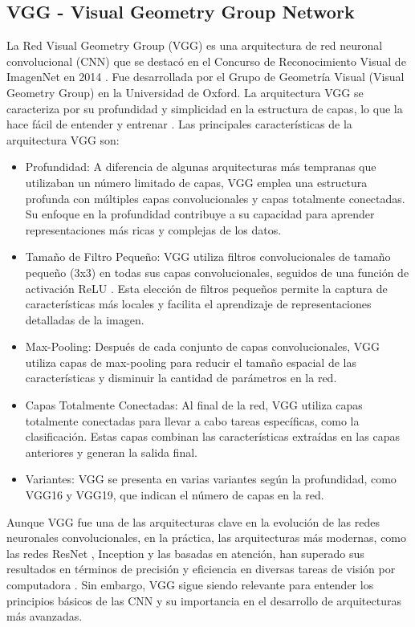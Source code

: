 \documentclass[12pt,twoside,titlepage]{ingenius}
\begin{document}
\begin{multicols}{2}
\subsection{VGG - Visual Geometry Group Network}
La Red Visual Geometry Group (VGG) es una arquitectura de red neuronal convolucional (CNN) que se destacó en el Concurso de Reconocimiento Visual de ImagenNet en 2014 \cite{11}. Fue desarrollada por el Grupo de Geometría Visual (Visual Geometry Group) en la Universidad de Oxford. La arquitectura VGG se caracteriza por su profundidad y simplicidad en la estructura de capas, lo que la hace fácil de entender y entrenar \cite{12}.
Las principales características de la arquitectura VGG son:
\begin{itemize}
	\item Profundidad: A diferencia de algunas arquitecturas más tempranas que utilizaban un número limitado de capas, VGG emplea una estructura profunda con múltiples capas convolucionales y capas totalmente conectadas. Su enfoque en la profundidad contribuye a su capacidad para aprender representaciones más ricas y complejas de los datos.
	\item Tamaño de Filtro Pequeño: VGG utiliza filtros convolucionales de tamaño pequeño (3x3) en todas sus capas convolucionales, seguidos de una función de activación ReLU . Esta elección de filtros pequeños permite la captura de características más locales y facilita el aprendizaje de representaciones detalladas de la imagen.
	\item Max-Pooling: Después de cada conjunto de capas convolucionales, VGG utiliza capas de max-pooling para reducir el tamaño espacial de las características y disminuir la cantidad de parámetros en la red.
	\item Capas Totalmente Conectadas: Al final de la red, VGG utiliza capas totalmente conectadas para llevar a cabo tareas específicas, como la clasificación. Estas capas combinan las características extraídas en las capas anteriores y generan la salida final.
	\item Variantes: VGG se presenta en varias variantes según la profundidad, como VGG16 y VGG19, que indican el número de capas en la red.
\end{itemize}

Aunque VGG fue una de las arquitecturas clave en la evolución de las redes neuronales convolucionales, en la práctica, las arquitecturas más modernas, como las redes ResNet , Inception  y las basadas en atención, han superado sus resultados en términos de precisión y eficiencia en diversas tareas de visión por computadora \cite{13}. Sin embargo, VGG sigue siendo relevante para entender los principios básicos de las CNN y su importancia en el desarrollo de arquitecturas más avanzadas. 


\end{multicols}
\end{document}
